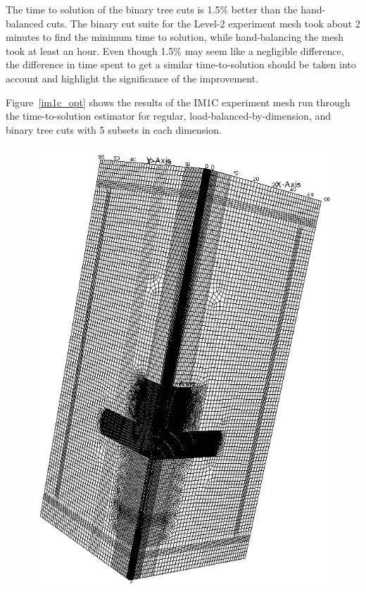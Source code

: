 The time to solution of the binary tree cuts is 1.5\% better than the hand-balanced cuts.
The binary cut suite for the Level-2 experiment mesh took about 2 minutes to find the minimum time to solution, while hand-balancing the mesh took at least an hour.
Even though 1.5\% may seem like a negligible difference, the difference in time spent to get a similar time-to-solution should be taken into account and highlight the significance of the improvement.

Figure~\ref{im1c_opt} shows the results of the IM1C experiment mesh run through the time-to-solution estimator for regular, load-balanced-by-dimension, and binary tree cuts with 5 subsets in each dimension.
\begin{figure}[ht]
\begin{minipage}[c]{0.65\textwidth}
\centering
\includegraphics[scale=0.3]{../figures/im1_mesh.png}

\end{minipage}
\end{figure}
